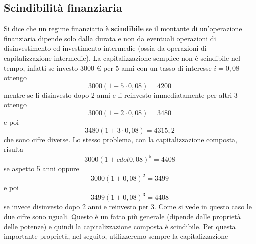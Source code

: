 \subsection{Scindibilità finanziaria} Si dice che un regime finanziario è 
\textbf{scindibile} se il montante di un'operazione finanziaria dipende solo 
dalla durata e non da eventuali operazioni di disinvestimento ed investimento 
intermedie (ossia da operazioni di capitalizzazione intermedie). La 
capitalizzazione semplice non è scindibile nel tempo, infatti se investo 3000 € 
per 5 anni con un tasso di interesse $i=0,08$ ottengo 
$$3000(1+5\cdot0,08)=4200$$ mentre se li disinvesto dopo 2 anni e li reinvesto 
immediatamente per altri 3 ottengo $$3000(1+2\cdot0,08)=3480$$ e poi 
$$3480(1+3\cdot0,08)=4315,2$$ che sono cifre diverse. Lo stesso problema, con la 
capitalizzazione composta, risulta $$3000(1+cdot0,08)^5=4408$$ se aspetto 5 anni 
oppure $$3000(1+0,08)^2=3499$$ e poi $$3499(1+0,08)^3=4408$$ se invece 
disinvesto dopo 2 anni e reinvesto per 3. Come si vede in questo caso le due 
cifre sono uguali. Questo è un fatto più generale (dipende dalle proprietà delle 
potenze) e quindi la capitalizzazione composta è scindibile. Per questa 
importante proprietà, nel seguito, utilizzeremo sempre la capitalizzazione 
